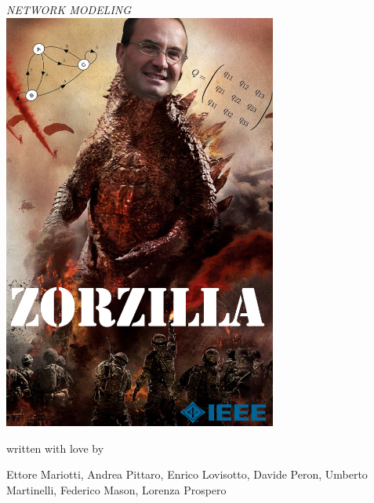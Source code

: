 \documentclass[a4paper, 12pt, twoside, openright, fleqn]{book}
\theoremstyle{theoremdd}
\theoremstyle{remark}
\begin{document}
\frontmatter

\begin{titlepage} %
\begin{center}


\hspace{0.5cm}

\emph{\Large{NETWORK MODELING}} \\
\vspace{1cm}
\includegraphics[width=9cm]{Zorzilla}\\
\vspace{0.5cm}
{written with love by\par}
{\Large Ettore Mariotti, Andrea Pittaro, Enrico Lovisotto, Davide Peron, Umberto Martinelli, Federico Mason, Lorenza Prospero\par}
\end{center}



\end{titlepage}
\end{document}
